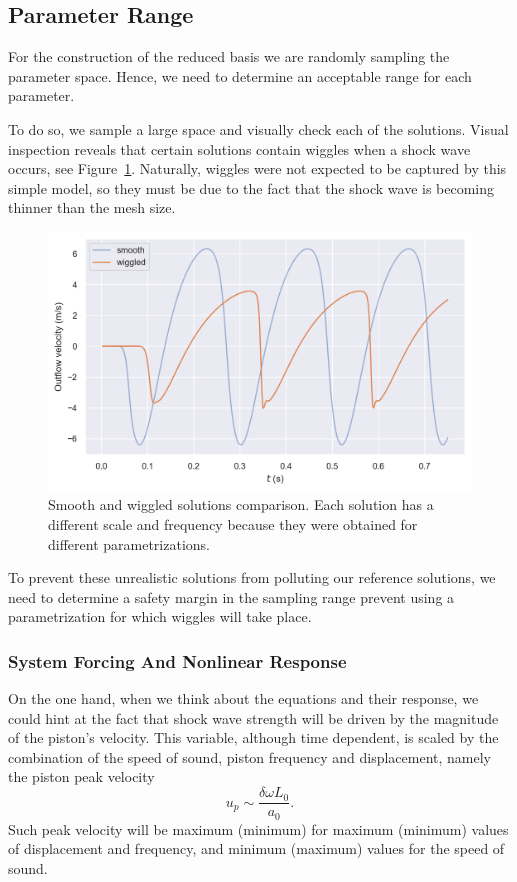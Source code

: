 \documentclass[../../thesis.tex]{subfiles}
\begin{document}
\subsection{Parameter Range}
For the construction of the reduced basis we are randomly sampling the parameter space.
Hence, we need to determine an acceptable range for each parameter.

To do so, we sample a large space and visually check each of the solutions.
Visual inspection reveals that certain solutions contain wiggles when a shock wave occurs, see Figure~\ref{fig:smooth_vs_wiggled}.
Naturally, wiggles were not expected to be captured by this simple model, 
so they must be due to the fact that the shock wave is becoming thinner than the mesh size.

\begin{figure}[h]
    \centering
    \includegraphics[width=1\columnwidth]{research_project/piston/figures/wiggles/smooth_vs_wiggled.png}
    \caption{Smooth and wiggled solutions comparison.
    Each solution has a different scale and frequency because they were obtained for different parametrizations.}
    \label{fig:smooth_vs_wiggled}
\end{figure}
To prevent these unrealistic solutions from polluting our reference solutions, we
need to determine a safety margin in the sampling range prevent using a parametrization for which wiggles will take place.


\subsubsection{System Forcing And Nonlinear Response}
\label{sec:fom_calibration_system_forcing}
On the one hand, when we think about the equations and their response, we could hint at the fact that shock wave strength will be driven by the magnitude of the piston's velocity.
This variable, although time dependent, is scaled by the combination of the speed of sound,
piston frequency and displacement, 
namely the piston peak velocity
\begin{equation}
    u_p \sim \frac{\delta \omega L_0}{a_0}.
\end{equation}
Such peak velocity will be maximum (minimum) for maximum (minimum) values of displacement and frequency, and minimum (maximum) values for the speed of sound.
\end{document}
